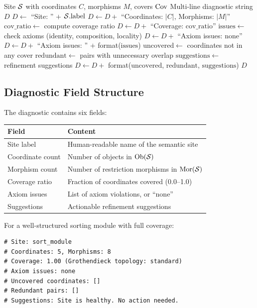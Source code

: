 \documentclass[11pt]{article}
\newcommand{\covrat}{\mathrm{cov\_ratio}}
\begin{document}
\begin{algorithm}[h]
\caption{Copilot Diagnostic Summary Generation}
\label{alg:diagnostic}
\begin{algorithmic}[1]
\REQUIRE Site $\mathcal{S}$ with coordinates $C$, morphisms $M$, covers $\mathrm{Cov}$
\ENSURE Multi-line diagnostic string $D$
\STATE $D \gets$ ``Site: '' $+$ $\mathcal{S}.\mathrm{label}$
\STATE $D \gets D +$ ``Coordinates: $|C|$, Morphisms: $|M|$''
\STATE $\covrat \gets$ compute coverage ratio
\STATE $D \gets D +$ ``Coverage: $\covrat$''
\STATE $\mathrm{issues} \gets$ check axioms (identity, composition, locality)
  \STATE $D \gets D +$ ``Axiom issues: none''
\ELSE
  \STATE $D \gets D +$ ``Axiom issues: '' $+$ format($\mathrm{issues}$)
\ENDIF
\STATE $\mathrm{uncovered} \gets$ coordinates not in any cover
\STATE $\mathrm{redundant} \gets$ pairs with unnecessary overlap
\STATE $\mathrm{suggestions} \gets$ refinement suggestions
\STATE $D \gets D +$ format($\mathrm{uncovered}$, $\mathrm{redundant}$, $\mathrm{suggestions}$)
\RETURN $D$
\end{algorithmic}
\end{algorithm}

\subsection{Diagnostic Field Structure}

The diagnostic contains six fields:

\begin{center}
\begin{tabular}{lp{8cm}}
\toprule
\textbf{Field} & \textbf{Content} \\
\midrule
Site label       & Human-readable name of the semantic site \\
Coordinate count & Number of objects in $\mathrm{Ob}(\mathcal{S})$ \\
Morphism count   & Number of restriction morphisms in $\mathrm{Mor}(\mathcal{S})$ \\
Coverage ratio   & Fraction of coordinates covered (0.0--1.0) \\
Axiom issues     & List of axiom violations, or ``none'' \\
Suggestions      & Actionable refinement suggestions \\
\bottomrule
\end{tabular}
\end{center}

\begin{example}\label{ex:healthy}
For a well-structured sorting module with full coverage:
\begin{lstlisting}[style=jugeo-python]
# Site: sort_module
# Coordinates: 5, Morphisms: 8
# Coverage: 1.00 (Grothendieck topology: standard)
# Axiom issues: none
# Uncovered coordinates: []
# Redundant pairs: []
# Suggestions: Site is healthy. No action needed.
\end{lstlisting}
\end{example}
\end{document}
